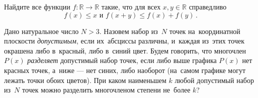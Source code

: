 \begin{problems}
\item
Найдите все функции $f \colon \mathbb{R} \to \mathbb{R}$ такие, что для всех
$x,y \in \mathbb{R}$ справедливо
\[
    f(x) \leq x
\text{ и }
    f(x + y) \leq f(x) + f(y)
\,.\]

\item
Дано натуральное число $N > 3$.
Назовем набор из~$N$ точек на~координатной плоскости \emph{допустимым}, если
их~абсциссы различны, и~каждая из~этих точек окрашена либо в~красный, либо
в~синий цвет.
Будем говорить, что многочлен $P(x)$ \emph{разделяет} допустимый набор точек,
если либо выше графика $P(x)$ нет красных точек, а~ниже --- нет синих, либо
наоборот (на~самом графике могут лежать точки обоих цветов).
При каком наименьшем $k$ любой допустимый набор из~$N$ точек можно разделить
многочленом степени не~более $k$?

\end{problems}


